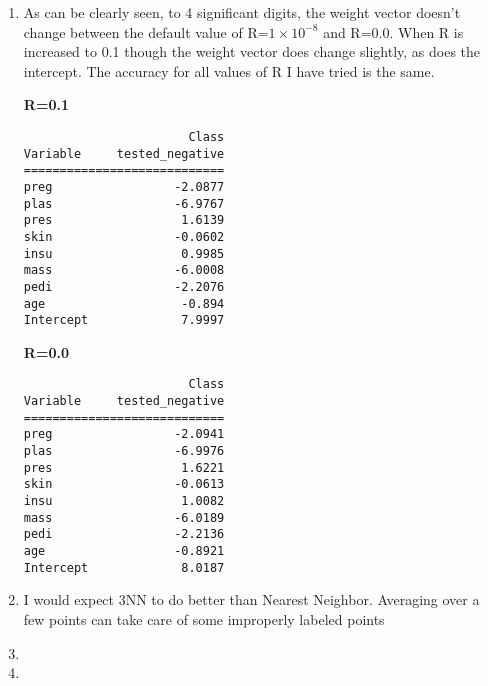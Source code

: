 \documentclass[12pt]{article}
\begin{document}
\begin{enumerate}
\begin{enumerate}
\begin{enumerate}
{\bf Weight Vector after normalization:}
\begin{verbatim}
                       Class
Variable     tested_negative
============================
preg                 -2.0941
plas                 -6.9976
pres                  1.6221
skin                 -0.0613
insu                  1.0082
mass                 -6.0189
pedi                 -2.2136
age                  -0.8921
Intercept             8.0187

\end{verbatim}

\end{enumerate}

\item %
As can be clearly seen, to 4 significant digits, the weight vector doesn't change between the default value of R=$1\times10^{-8}$ and R=0.0. When R is increased to 0.1 though the weight vector does change slightly, as does the intercept. The accuracy for all values of R I have tried is the same.



{\bf R=0.1}
\begin{verbatim}
                       Class
Variable     tested_negative
============================
preg                 -2.0877
plas                 -6.9767
pres                  1.6139
skin                 -0.0602
insu                  0.9985
mass                 -6.0008
pedi                 -2.2076
age                   -0.894
Intercept             7.9997
\end{verbatim}
{\bf R=0.0}
\begin{verbatim}
                       Class
Variable     tested_negative
============================
preg                 -2.0941
plas                 -6.9976
pres                  1.6221
skin                 -0.0613
insu                  1.0082
mass                 -6.0189
pedi                 -2.2136
age                  -0.8921
Intercept             8.0187
\end{verbatim}

\item %
I would expect 3NN to do better than Nearest Neighbor. Averaging over a few points can take care of some improperly labeled points 

\item %

\item %

\end{enumerate}
\end{enumerate}
\end{document}
